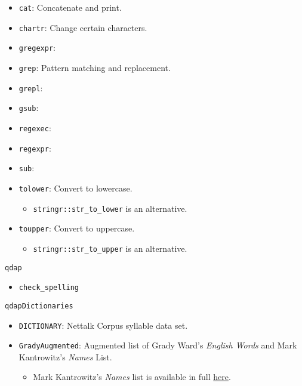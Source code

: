 \documentclass[]{book}
\providecommand{\tightlist}{%
  \setlength{\itemsep}{0pt}\setlength{\parskip}{0pt}}
\begin{document}
\begin{itemize}
\tightlist
\item
  \texttt{cat}: Concatenate and print.
\item
  \texttt{chartr}: Change certain characters.
\item
  \texttt{gregexpr}:
\item
  \texttt{grep}: Pattern matching and replacement.
\item
  \texttt{grepl}:
\item
  \texttt{gsub}:
\item
  \texttt{regexec}:
\item
  \texttt{regexpr}:
\item
  \texttt{sub}:
\item
  \texttt{tolower}: Convert to lowercase.

  \begin{itemize}
  \tightlist
  \item
    \texttt{stringr::str\_to\_lower} is an alternative.
  \end{itemize}
\item
  \texttt{toupper}: Convert to uppercase.

  \begin{itemize}
  \tightlist
  \item
    \texttt{stringr::str\_to\_upper} is an alternative.
  \end{itemize}
\end{itemize}

\texttt{qdap}

\begin{itemize}
\tightlist
\item
  \texttt{check\_spelling}
\end{itemize}

\texttt{qdapDictionaries}

\begin{itemize}
\tightlist
\item
  \texttt{DICTIONARY}: Nettalk Corpus syllable data set.
\item
  \texttt{GradyAugmented}: Augmented list of Grady Ward's \emph{English Words} and Mark Kantrowitz's \emph{Names} List.

  \begin{itemize}
  \tightlist
  \item
    Mark Kantrowitz's \emph{Names} list is available in full \href{http://www.cs.cmu.edu/afs/cs/project/ai-repository/ai/areas/nlp/corpora/names/}{here}.
  \end{itemize}
\end{itemize}
\end{document}

